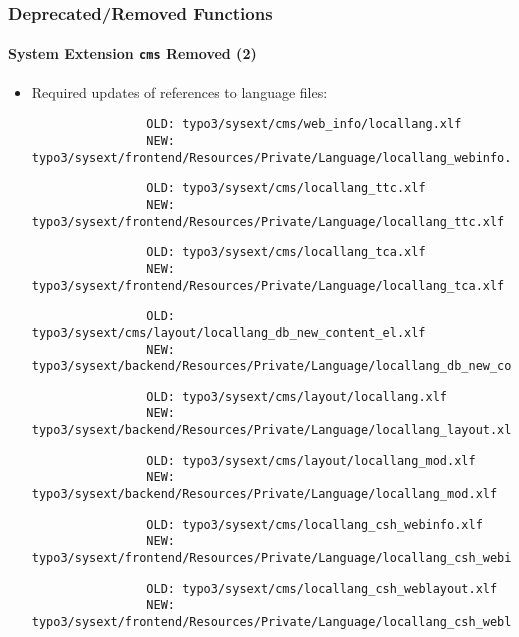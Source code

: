 \begin{frame}[fragile]
	\frametitle{Deprecated/Removed Functions}
	\framesubtitle{System Extension \texttt{cms} Removed (2)}

	\lstset{basicstyle=\tiny\ttfamily}

	\begin{itemize}

		\item Required updates of references to language files:


			\begin{lstlisting}
				OLD: typo3/sysext/cms/web_info/locallang.xlf
				NEW: typo3/sysext/frontend/Resources/Private/Language/locallang_webinfo.xlf
			\end{lstlisting}
			\vspace{-0.3cm}
			\begin{lstlisting}
				OLD: typo3/sysext/cms/locallang_ttc.xlf
				NEW: typo3/sysext/frontend/Resources/Private/Language/locallang_ttc.xlf
			\end{lstlisting}
			\vspace{-0.3cm}
			\begin{lstlisting}
				OLD: typo3/sysext/cms/locallang_tca.xlf
				NEW: typo3/sysext/frontend/Resources/Private/Language/locallang_tca.xlf
			\end{lstlisting}
			\vspace{-0.3cm}
			\begin{lstlisting}
				OLD: typo3/sysext/cms/layout/locallang_db_new_content_el.xlf
				NEW: typo3/sysext/backend/Resources/Private/Language/locallang_db_new_content_el.xlf
			\end{lstlisting}
			\vspace{-0.3cm}
			\begin{lstlisting}
				OLD: typo3/sysext/cms/layout/locallang.xlf
				NEW: typo3/sysext/backend/Resources/Private/Language/locallang_layout.xlf
			\end{lstlisting}
			\vspace{-0.3cm}
			\begin{lstlisting}
				OLD: typo3/sysext/cms/layout/locallang_mod.xlf
				NEW: typo3/sysext/backend/Resources/Private/Language/locallang_mod.xlf
			\end{lstlisting}
			\vspace{-0.3cm}
			\begin{lstlisting}
				OLD: typo3/sysext/cms/locallang_csh_webinfo.xlf
				NEW: typo3/sysext/frontend/Resources/Private/Language/locallang_csh_webinfo.xlf
			\end{lstlisting}
			\vspace{-0.3cm}
			\begin{lstlisting}
				OLD: typo3/sysext/cms/locallang_csh_weblayout.xlf
				NEW: typo3/sysext/frontend/Resources/Private/Language/locallang_csh_weblayout.xlf
			\end{lstlisting}


\end{itemize}
\end{frame}
